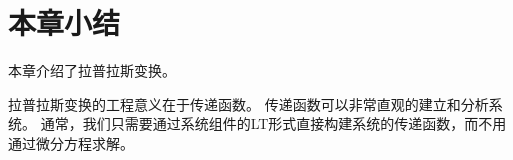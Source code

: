 \section{本章小结}

本章介绍了拉普拉斯变换。

拉普拉斯变换的工程意义在于传递函数。
传递函数可以非常直观的建立和分析系统。
通常，我们只需要通过系统组件的LT形式直接构建系统的传递函数，而不用通过微分方程求解。




